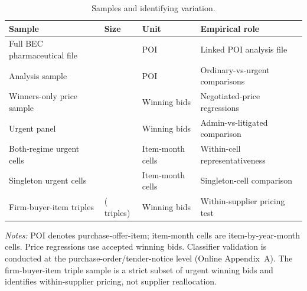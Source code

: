 \begin{table}[ht]
\centering
\caption{Samples and identifying variation.}
\label{tab:sample_variation_v9}
\begin{threeparttable}
\small
\setlength{\tabcolsep}{5pt}
\begin{tabular}{@{}l l l l@{}}
\toprule
Sample & Size & Unit & Empirical role \\
\midrule
Full BEC pharmaceutical file & \BPnPOIfull{} & POI & Linked POI analysis file \\
Analysis sample & \BPnAnalysisSample{} & POI & Ordinary-vs-urgent comparisons \\
Winners-only price sample & \BPnegNobs{} & Winning bids & Negotiated-price regressions \\
Urgent panel & \BPnUTG{} & Winning bids & Admin-vs-litigated comparison \\
Both-regime urgent cells & \BPbothCellN{} & Item-month cells & Within-cell representativeness \\
Singleton urgent cells & \BPbothCellNSingleton{} & Item-month cells & Singleton-cell comparison \\
Firm-buyer-item triples & \BPutgTripleNUTG{} (\BPutgTripleCountUTG{} triples) & Winning bids & Within-supplier pricing test \\
\bottomrule
\end{tabular}
\begin{tablenotes}[flushleft]\footnotesize
\item \textit{Notes:} POI denotes purchase-offer-item; item-month cells are item-by-year-month cells. Price regressions use accepted winning bids. Classifier validation is conducted at the purchase-order/tender-notice level (Online Appendix~A). The firm-buyer-item triple sample is a strict subset of urgent winning bids and identifies within-supplier pricing, not supplier reallocation.
\end{tablenotes}
\end{threeparttable}
\end{table}
